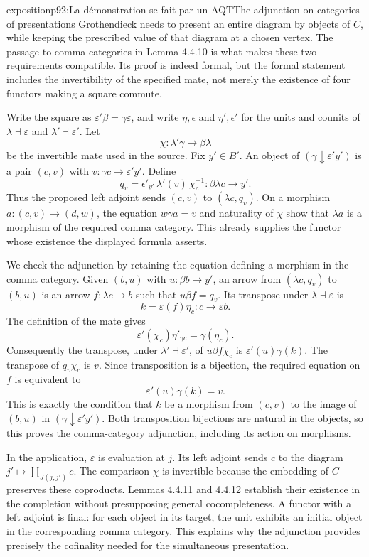 \begin{dcomment}{exposition}{p92:La démonstration se fait par un AQT}{The adjunction on categories of presentations}
Grothendieck needs to present an entire diagram by objects of $C$, while keeping the prescribed value of that diagram at a chosen vertex. The passage to comma categories in Lemma 4.4.10 is what makes these two requirements compatible. Its proof is indeed formal, but the formal statement includes the invertibility of the specified mate, not merely the existence of four functors making a square commute.

Write the square as $\varepsilon'\beta=\gamma\varepsilon$, and write $\eta,\epsilon$ and $\eta',\epsilon'$ for the units and counits of $\lambda\dashv\varepsilon$ and $\lambda'\dashv\varepsilon'$. Let
\[
\chi:\lambda'\gamma\longrightarrow\beta\lambda
\]
be the invertible mate used in the source. Fix $y'\in B'$. An object of $(\gamma\downarrow\varepsilon'y')$ is a pair $(c,v)$ with $v:\gamma c\to\varepsilon'y'$. Define
\[
q_v=\epsilon'_{y'}\,\lambda'(v)\,\chi_c^{-1}:
\beta\lambda c\longrightarrow y'.
\]
Thus the proposed left adjoint sends $(c,v)$ to $(\lambda c,q_v)$. On a morphism $a:(c,v)\to(d,w)$, the equation $w\gamma a=v$ and naturality of $\chi$ show that $\lambda a$ is a morphism of the required comma category. This already supplies the functor whose existence the displayed formula asserts.

We check the adjunction by retaining the equation defining a morphism in the comma category. Given $(b,u)$ with $u:\beta b\to y'$, an arrow from $(\lambda c,q_v)$ to $(b,u)$ is an arrow $f:\lambda c\to b$ such that $u\beta f=q_v$. Its transpose under $\lambda\dashv\varepsilon$ is
\[
k=\varepsilon(f)\eta_c:c\longrightarrow\varepsilon b.
\]
The definition of the mate gives
\[
\varepsilon'(\chi_c)\eta'_{\gamma c}=\gamma(\eta_c).
\]
Consequently the transpose, under $\lambda'\dashv\varepsilon'$, of $u\beta f\chi_c$ is $\varepsilon'(u)\gamma(k)$. The transpose of $q_v\chi_c$ is $v$. Since transposition is a bijection, the required equation on $f$ is equivalent to
\[
\varepsilon'(u)\gamma(k)=v.
\]
This is exactly the condition that $k$ be a morphism from $(c,v)$ to the image of $(b,u)$ in $(\gamma\downarrow\varepsilon'y')$. Both transposition bijections are natural in the objects, so this proves the comma-category adjunction, including its action on morphisms.

In the application, $\varepsilon$ is evaluation at $j$. Its left adjoint sends $c$ to the diagram $j'\mapsto\coprod_{J(j,j')}c$. The comparison $\chi$ is invertible because the embedding of $C$ preserves these coproducts. Lemmas 4.4.11 and 4.4.12 establish their existence in the completion without presupposing general cocompleteness. A functor with a left adjoint is final: for each object in its target, the unit exhibits an initial object in the corresponding comma category. This explains why the adjunction provides precisely the cofinality needed for the simultaneous presentation.
\end{dcomment}

